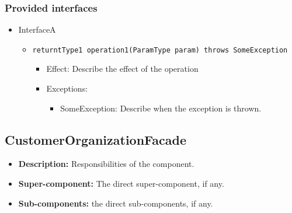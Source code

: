 \documentclass[a4paper,10pt]{article}
\begin{document}
\subsubsection*{Provided interfaces}
\begin{itemize}
    \item InterfaceA
    \begin{itemize}
        \item \texttt{returntType1 operation1(ParamType param) throws SomeException}
        \begin{itemize}
            \item Effect: Describe the effect of the operation
            \item Exceptions:
            \begin{itemize}
                \item SomeException: Describe when the exception is thrown.
            \end{itemize}
        \end{itemize}
    \end{itemize}
\end{itemize}

\subsection{CustomerOrganizationFacade}
\begin{itemize}
    \item \textbf{Description:} Responsibilities of the component.
    \item \textbf{Super-component:} The direct super-component, if any.
    \item \textbf{Sub-components:} the direct sub-components, if any.
\end{itemize}
\end{document}

